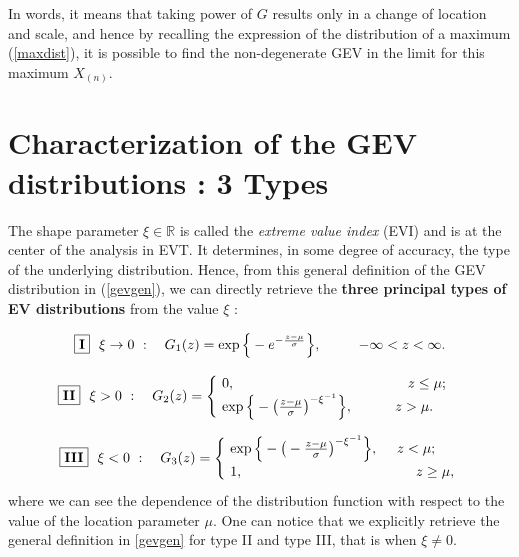 In words, it means that taking power of $G$ results only in a change of location and scale, and hence by recalling the expression of the distribution of a maximum (\ref{maxdist}), it is possible to find the non-degenerate GEV in the limit for this maximum $X_{(n)}$.

\section{Characterization of the GEV distributions : 3 Types}\label{sec:gevdistri}

The shape parameter $\xi\in\mathbb{R}$ is called the \emph{extreme value index} (EVI) and is at the center of the analysis in EVT. It determines, in some degree of accuracy, the type of the underlying distribution.
Hence, from this general definition of the GEV distribution in (\ref{gevgen}), we can directly retrieve the \textbf{three principal types of EV distributions} from the value $\xi$ :

\begin{equation}\label{gumb}
\boxed{\textbf{\text{I}}}\ \  \xi \to 0 \ : \quad G_{1}(z)= 
\exp\Big\{-e^{-\frac{z-\mu}{\sigma}}\Big\}, \ \ \quad \ \ \ -\infty<z<\infty.    
\end{equation}


\begin{equation} \label{frech}
\boxed{\textbf{\text{II}}} \ \  \xi> 0 \ : \quad G_{2}(z)=
\begin{cases}
\ 0, \ \ \ \ \ \ \ \ \ \ \ \qquad \quad \ \ \ \ \ \ \ \ \ \ \ \ \quad \ \ z\leq \mu; \\
\ \exp\Big\{-\big(\frac{z-\mu}{\sigma}\big)^{-\xi^{-1}}\Big\}, \ \ \ \ \ \ \ \ \ z>\mu.    
\end{cases}
\end{equation}

\begin{equation} \label{weib}
\ \ \boxed{\textbf{\text{III}}} \ \ \xi<0 \ : \quad G_{3}(z)=\begin{cases}
\ \exp\Big\{-\big(-\frac{z-\mu}{\sigma}\big)^{-\xi^{-1}}\Big\}, \ \ \ \  z<\mu;     \\
\  1, \ \ \ \ \ \ \qquad \quad \quad \ \ \ \ \ \ \ \ \ \ \ \ \ \ \ \ \quad z\geq \mu,
\end{cases}
\end{equation}
where we can see the dependence of the distribution function with respect to the value of the location parameter $\mu$. One can notice that we explicitly retrieve the general definition in \ref{gevgen} for type II and type III, that is when $\xi\neq 0$.


